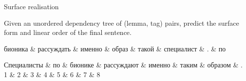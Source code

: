 \documentclass[10pt, compress]{beamer}
\begin{document}
\begin{frame}{Surface realisation}

Given an unordered dependency tree of (lemma, tag) pairs, predict
the surface form and linear order of the final sentence.

\begin{dependency}
      \begin{deptext}[column sep=1mm,column 1/.style={anchor=base west}]
           бионика \& рассуждать \& именно \& образ \& такой \& специалист \& . \& по  \\
        \end{deptext}
\end{dependency}

\begin{dependency}
      \begin{deptext}[column sep=1mm,column 1/.style={anchor=base west}]
	   Специалисты \& по \& бионике \& рассуждают \& именно \& таким \& образом \& . \\
            1   \& 2 \& 3 \& 4 \& 5 \& 6 \& 7 \& 8 \\
        \end{deptext}
\end{dependency}


\end{frame}
\end{document}
